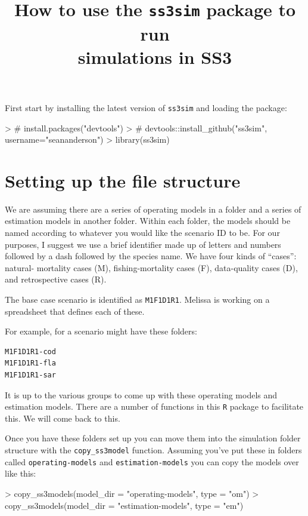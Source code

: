 \documentclass[12pt]{article}
\title{How to use the \texttt{ss3sim} package to run\\simulations in SS3}
\date{}
\begin{document}
\maketitle

\noindent
First start by installing the latest version of \texttt{ss3sim} and loading the package:

\begin{Schunk}
\begin{Sinput}
> # install.packages("devtools")
> # devtools::install_github("ss3sim", username="seananderson")
> library(ss3sim)
\end{Sinput}
\end{Schunk}

\section*{Setting up the file structure}
We are assuming there are a series of operating models in a folder and a series of estimation models in another folder. Within each folder, the models should be named according to whatever you would like the scenario ID to be. For our purposes, I suggest we use a brief identifier made up of letters and numbers followed by a dash followed by the species name. We have four kinds of ``cases'': natural- mortality cases (M), fishing-mortality cases (F), data-quality cases (D), and retrospective cases (R). 

The base case scenario is identified as \texttt{M1F1D1R1}. Melissa is working on a spreadsheet that defines each of these.

For example, for a scenario might have these folders:

\begin{verbatim}
M1F1D1R1-cod
M1F1D1R1-fla
M1F1D1R1-sar
\end{verbatim}

\noindent
It is up to the various groups to come up with these operating models and estimation models. There are a number of functions in this \texttt{R} package to facilitate this. We will come back to this. 

Once you have these folders set up you can move them into the simulation folder structure with the \texttt{copy\_ss3model} function. Assuming you've put these in folders called \texttt{operating-models} and \texttt{estimation-models} you can copy the models over like this:

\begin{Schunk}
\begin{Sinput}
> copy_ss3models(model_dir = "operating-models", type = "om")
> copy_ss3models(model_dir = "estimation-models", type = "em")
\end{Sinput}
\end{Schunk}
\end{document}
